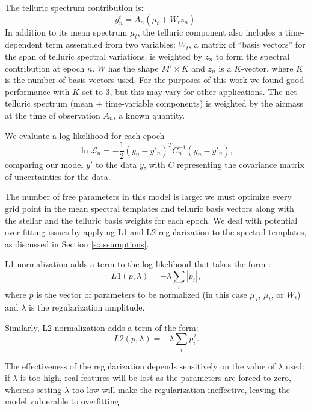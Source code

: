\documentclass[modern]{aastex62}
\begin{document}
The telluric spectrum contribution is:
\begin{equation}
y_{n}^t =  A_n(\mu_{t} + W_{t} z_n).
\end{equation}
In addition to its mean spectrum $\mu_t$, the telluric component also includes a time-dependent term assembled from two variables: $W_t$, a matrix of ``basis vectors'' for the span of telluric spectral variations, is weighted by $z_n$ to form the spectral contribution at epoch $n$.
$W$ has the shape $M' \times K$ and $z_n$ is a $K$-vector, where $K$ is the number of basis vectors used.
For the purposes of this work we found good performance with $K$ set to 3, but this may vary for other applications.
The net telluric spectrum (mean + time-variable components) is weighted by the airmass at the time of observation $A_n$, a known quantity.

We evaluate a log-likelihood for each epoch
\begin{equation}
\ln \mathcal{L}_n = -\frac{1}{2} (y_{n} - y'_{n})^T C_{n}^{-1} (y_{n}-y'_{n}),
\end{equation}
comparing our model $y'$ to the data $y$, with $C$ representing the covariance matrix of uncertainties for the data.

The number of free parameters in this model is large: we must optimize every grid point in the mean spectral templates and telluric basis vectors along with the stellar \RV and the telluric basis weights for each epoch.
We deal with potential over-fitting issues by applying L1 and L2 regularization to the spectral templates, as discussed in Section \ref{s:assumptions}.

L1 normalization adds a term to the log-likelihood that takes the form :
$$ L1(p, \lambda) = -\lambda \sum_{i} | p_{i} | ,$$
where $p$ is the vector of parameters to be normalized (in this case $\mu_{{\star}}$, $\mu_{{t}}$, or $W_{t}$) and $\lambda$ is the regularization amplitude.

Similarly, L2 normalization adds a term of the form:
$$ L2(p, \lambda) = -\lambda \sum_{i} p_{i}^2 .$$

The effectiveness of the regularization depends sensitively on the value of $\lambda$ used: if $\lambda$ is too high, real features will be lost as the parameters are forced to zero, whereas setting $\lambda$ too low will make the regularization ineffective, leaving the model vulnerable to overfitting.
\end{document}
